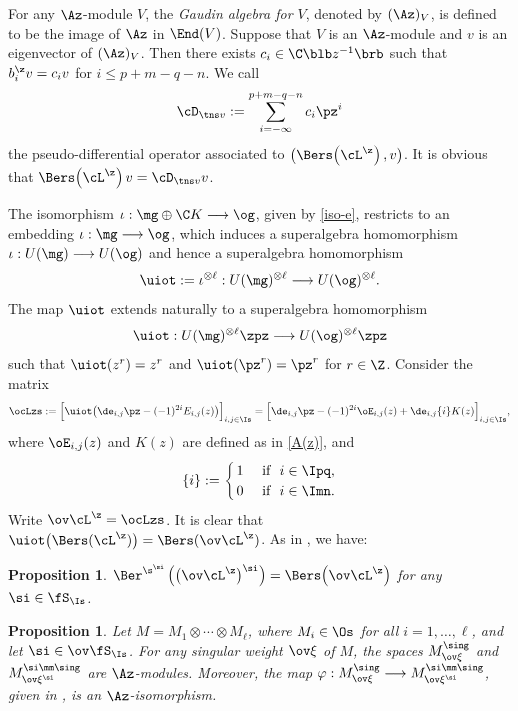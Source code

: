\documentclass[11pt, reqno]{amsart}
\newtheorem{prop}[thm]{Proposition}
\theoremstyle{definition}
\theoremstyle{remark}
\numberwithin{equation}{section}
\begin{document}
For any $\Az$-module $V$, the \emph{Gaudin algebra for $V$}, denoted by $(\Az)_V$, is defined to be the image of $\Az$ in $\End(V)$.
Suppose that $V$ is an $\Az$-module and $v$ is an eigenvector of $(\Az)_V$. Then there exists $c_i \in \C \blb z^{-1} \brb$ such that $b_i^\z v=c_i v$ for $i \le p+m-q-n$.
We call
$$
\cD_{\tns v}:= \sum_{i=-\infty}^{p+m-q-n} c_i  \pz^i
$$
the pseudo-differential operator associated to $\big(\Bers \! \left( \cL^\z\right), v \big)$.
It is obvious that $\Bers \! \left( \cL^\z\right) v=\cD_{\tns v} v$.

The isomorphism $\iota: \mg\oplus \C K \longrightarrow\og$, given by \eqref{iso-e}, restricts to an embedding $\iota: \mg \longrightarrow\og$, which induces a superalgebra homomorphism
$\iota: U(\mg) \longrightarrow U(\og)$ and hence a superalgebra homomorphism
$$
\uiot:=\iota^{\otimes \ell} : U(\mg)^{\otimes \ell} \longrightarrow U(\og)^{\otimes \ell}.
$$
The map $\uiot$ extends naturally to a superalgebra homomorphism
$$
\uiot : U(\mg)^{\otimes \ell}\zpz \longrightarrow U(\og)^{\otimes \ell}\zpz
$$
such that $\uiot (z^r)=z^r$ and $\uiot (\pz^r)=\pz^r$ for $r \in \Z$.
Consider the matrix
$$
\ocLzs:= \Big[\uiot \big(\de_{i,j}\pz-(-1)^{2i}E_{i,j}(z) \big) \Big]_{i,j \in \Is}=\Big[ \de_{i,j}\pz-(-1)^{2i} \oE_{i,j}(z) +\de_{i,j}\{i\}K(z)\Big]_{i,j \in \Is},
$$
where $\oE_{i,j}(z)$ and $K(z)$ are defined as in \eqref{A(z)}, and
$$
\{i\}:=\begin{cases}
\, 1 & \,\, \mbox{if} \ \  i \in \Ipq,\\
\, 0 & \,\, \mbox{if} \ \  i \in \Imn.
\end{cases}
$$
Write $\ov\cL^\z=\ocLzs$.
It is clear that $\uiot\big( \Bers ( \cL^\z)\big)=\Bers  ( \ov\cL^\z )$.
As in , we have:

\begin{prop} \label{Ber-sig-hL}
$\Ber^{\s^\si} \left(\big(\ov\cL^\z \big)^\si \right)=\Bers \! \left( \ov\cL^\z \right)$ for any $\si \in \fS_\Is$.
\end{prop}



\begin{prop} \label{A-iso}
Let $M=M_1 \otimes \cdots \otimes M_\ell$, where $M_i \in \Os$ for all $i=1, \ldots, \ell$, and let $\si \in \ov \fS_\Is$.
For any singular weight $\ov\xi$ of $M$, the spaces $M_{\ov\xi}^{\sing}$ and $M_{\ov\xi^\si}^{\si\mm\sing}$ are $\Az$-modules.
Moreover, the map $\varphi: M_{\ov\xi}^{\sing}\longrightarrow M_{\ov\xi^\si}^{\si\mm\sing}$, given in , is an $\Az$-isomorphism.
\end{prop}
\end{document}
